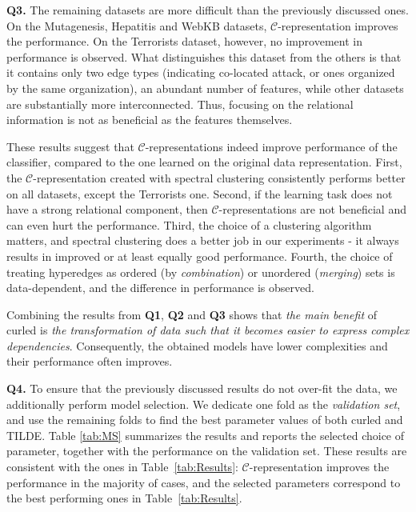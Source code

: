 \textbf{Q3.}
The remaining datasets are more difficult than the previously discussed ones.
On the Mutagenesis, Hepatitis and WebKB datasets, $\mathcal{C}$-representation improves the performance.
On the Terrorists dataset, however, no improvement in performance is observed.
What distinguishes this dataset from the others is that it contains only two edge types (indicating co-located attack, or ones organized by the same organization), an abundant number of features, while other datasets are substantially more interconnected.
Thus, focusing on the relational information is not as beneficial as the features themselves. 

These results suggest that $\mathcal{C}$-representations indeed improve performance of the classifier, compared to the one learned on the original data representation.
First, the $\mathcal{C}$-representation created with spectral clustering consistently performs better on all datasets, except the Terrorists one.
Second, if the learning  task does not have a strong relational component, then $\mathcal{C}$-representations are not beneficial and can even hurt the performance.
Third, the choice of a clustering algorithm matters, and spectral clustering does a better job in our experiments - it always results in improved or at least equally good performance.
Fourth, the choice of treating hyperedges as ordered (by \textit{combination}) or unordered (\textit{merging}) sets is data-dependent, and the difference in performance is observed.


Combining the results from \textbf{Q1}, \textbf{Q2} and \textbf{Q3} shows that \textit{the main benefit} of \gls{curled} is \textit{the transformation of data such that it becomes easier to express complex dependencies}.
Consequently, the obtained models have lower complexities and  their performance often improves.


\textbf{Q4.} To ensure that the previously discussed results do not over-fit the data, we additionally perform model selection.
We dedicate one fold as the \textit{validation set}, and use the remaining folds to find the best parameter values of both \gls{curled} and TILDE.
Table \ref{tab:MS} summarizes the results and reports the selected choice of parameter, together with the performance on the validation set.
These results are consistent with the ones in Table~\ref{tab:Results}: $\mathcal{C}$-representation improves the performance in the majority of cases, and the selected parameters correspond to the best performing ones in Table~\ref{tab:Results}.

